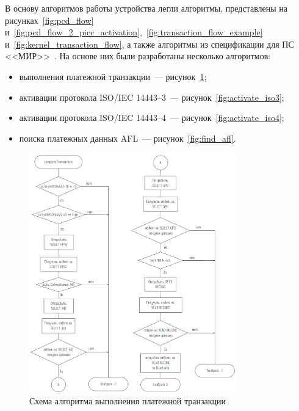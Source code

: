 
В основу алгоритмов работы устройства легли алгоритмы, представлены на рисунках~\ref{fig:pcd_flow} и~\ref{fig:pcd_flow_2_picc_activation},~\ref{fig:transaction_flow_example} и~\ref{fig:kernel_transaction_flow}, а также алгоритмы из спецификации для ПС <<МИР>>~\cite{book_mir}.
На основе них были разработаны несколько алгоритмов:

\begin{itemize}
    \item выполнения платежной транзакции~--- рисунок~\ref{fig:complete_transaction};
    \item активации протокола ISO/IEC 14443--3~--- рисунок~\ref{fig:activate_iso3};
    \item активации протокола ISO/IEC 14443--4~--- рисунок~\ref{fig:activate_iso4};
    \item поиска платежных данных AFL~--- рисунок~\ref{fig:find_afl}.
\end{itemize}


\begin{figure}[H]
    \centering
    \includegraphics[width=0.8\textwidth]{images/design/complete_transaction}
    \caption{\centering Схема алгоритма выполнения платежной транзакции}
    \label{fig:complete_transaction}
\end{figure}

